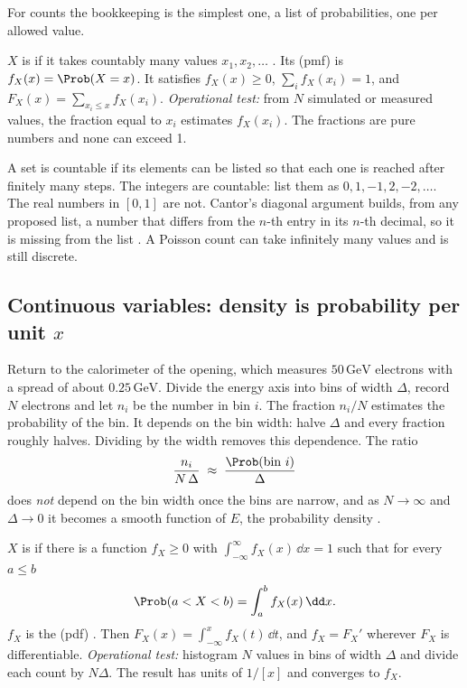 For counts the bookkeeping is the simplest one, a list of probabilities, one
per allowed value.

\begin{workdef}
$X$ is  if it takes countably many values $x_1,x_2,\dots$
. Its
 (pmf) is $f_X(x)=\Prob(X=x)$. It
satisfies $f_X(x)\ge0$, $\sum_if_X(x_i)=1$, and
$F_X(x)=\sum_{x_i\le x}f_X(x_i)$.
\emph{Operational test:} from $N$ simulated or measured values, the fraction
equal to $x_i$ estimates $f_X(x_i)$. The fractions are pure numbers and none
can exceed 1.
\end{workdef}

A set is countable if its elements can be listed so that each one is reached
after finitely many steps. The integers are countable: list them as
$0,1,-1,2,-2,\dots$. The real numbers in $[0,1]$ are not. Cantor's diagonal argument builds, from any proposed list, a number
that differs from the $n$-th entry in its $n$-th decimal, so it is missing
from the list . A Poisson count can take
infinitely many values and is still discrete.

\subsection{Continuous variables: density is probability per unit \texorpdfstring{$x$}{x}}

Return to the calorimeter of the opening, which measures $50\,\mathrm{GeV}$
electrons with a spread of about $0.25\,\mathrm{GeV}$. Divide the energy axis
into bins of width $\Delta$, record $N$ electrons and let $n_i$ be the number
in bin $i$. The fraction $n_i/N$ estimates the probability of the bin. It
depends on the bin width: halve $\Delta$ and every fraction roughly halves.
Dividing by the width removes this dependence. The ratio
\[
  \frac{n_i}{N\,\Delta}
  \;\approx\;\frac{\Prob(\text{bin } i)}{\Delta}
\]
does \emph{not} depend on the bin width once the bins are narrow, and as
$N\to\infty$ and $\Delta\to0$ it becomes a smooth function of $E$, the
probability density 
.

\begin{workdef}
$X$ is  if there is a function $f_X\ge0$ with
$\int_{-\infty}^{\infty}f_X(x)\,\dd x=1$ such that for every $a\le b$
\[
  \Prob(a<X<b)=\int_a^b f_X(x)\,\dd x .
\]
$f_X$ is the  (pdf)
. Then $F_X(x)=\int_{-\infty}^xf_X(t)\,\dd t$,
and $f_X=F_X'$ wherever $F_X$ is differentiable.
\emph{Operational test:} histogram $N$ values in bins of width $\Delta$ and
divide each count by $N\Delta$. The result has units of $1/[x]$ and converges
to $f_X$.
\end{workdef}

